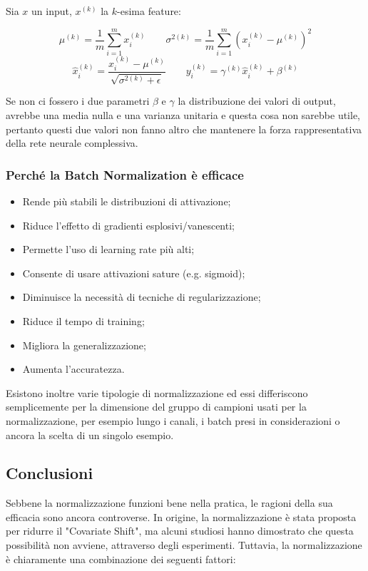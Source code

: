 Sia $x$ un input, $x^{(k)}$ la $k$-esima feature:

\begin{equation*}
    \mu^{(k)} = \frac{1}{m} \sum_{i=1}^m x_i^{(k)} \quad\quad \sigma^{2(k)} = \frac{1}{m} \sum_{i=1}^m (x_i^{(k)} - \mu^{(k)})^2
\end{equation*}
\begin{equation*}
    \hat{x}_i^{(k)} = \frac{x_i^{(k)} - \mu^{(k)}}{\sqrt{\sigma^{2(k)} + \epsilon}} \quad\quad y_i^{(k)} = \gamma^{(k)} \hat{x}_i^{(k)} + \beta^{(k)}
\end{equation*}

Se non ci fossero i due parametri $\beta$ e $\gamma$ la distribuzione dei valori di output, avrebbe una media nulla e una varianza unitaria e questa cosa non sarebbe utile, pertanto questi due valori non fanno altro che mantenere la forza rappresentativa della rete neurale complessiva.


\subsubsection{Perché la Batch Normalization è efficace}
\begin{itemize}
  \item Rende più stabili le distribuzioni di attivazione;
  \item Riduce l’effetto di gradienti esplosivi/vanescenti;
  \item Permette l’uso di learning rate più alti;
  \item Consente di usare attivazioni sature (e.g. sigmoid);
  \item Diminuisce la necessità di tecniche di regularizzazione;
  \item Riduce il tempo di training;
  \item Migliora la generalizzazione;
  \item Aumenta l'accuratezza.
\end{itemize}

Esistono inoltre varie tipologie di normalizzazione ed essi differiscono semplicemente per la dimensione del gruppo di campioni usati per la normalizzazione, per esempio lungo i canali, i batch presi in considerazioni o ancora la scelta di un singolo esempio.


\subsection{Conclusioni}
Sebbene la normalizzazione funzioni bene nella pratica, le ragioni della sua efficacia sono ancora controverse. In origine, la normalizzazione è stata proposta per ridurre il "Covariate Shift", ma alcuni studiosi hanno dimostrato che questa possibilità non avviene, attraverso degli esperimenti. Tuttavia, la normalizzazione è chiaramente una combinazione dei seguenti fattori:

